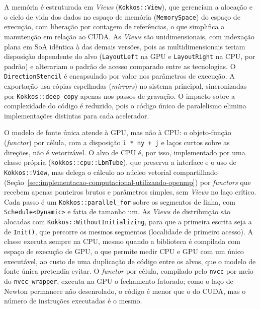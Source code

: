 A memória é estruturada em \textit{Views} (\texttt{Kokkos::View}), que gerenciam a alocação e o ciclo de vida dos dados no espaço de memória (\texttt{MemorySpace}) do espaço de execução, com liberação por contagem de referências, o que simplifica a manutenção em relação ao CUDA.
As \textit{Views} são unidimensionais, com indexação plana em SoA idêntica à das demais versões, pois as multidimensionais teriam disposição dependente do alvo (\texttt{LayoutLeft} na GPU e \texttt{LayoutRight} na CPU, por padrão) e alterariam o padrão de acesso comparado entre as tecnologias.
O \texttt{DirectionStencil} é encapsulado por valor nos parâmetros de execução.
A exportação usa cópias espelhadas (\textit{mirrors}) no sistema principal, sincronizadas por \texttt{Kokkos::deep\_copy} apenas nos passos de gravação.
O impacto sobre a complexidade do código é reduzido, pois o código único de paralelismo elimina implementações distintas para cada acelerador.

O modelo de fonte única atende à GPU, mas não à CPU: o objeto-função (\textit{functor}) por célula, com a disposição \texttt{i * ny + j} e laços curtos sobre as direções, não é vetorizável.
O alvo de CPU é, por isso, implementado por uma classe própria (\texttt{kokkos::cpu::LbmTube}), que preserva a interface e o uso de \texttt{Kokkos::View}, mas delega o cálculo ao núcleo vetorial compartilhado (Seção~\ref{sec:implementacao-computacional-utilizando-openmp}) por \textit{functors} que recebem apenas ponteiros brutos e parâmetros simples, sem \textit{Views} no laço crítico.
Cada passo é um \texttt{Kokkos::parallel\_for} sobre os segmentos de linha, com \texttt{Schedule<Dynamic>} e fatia de tamanho um. %
As \textit{Views} de distribuição são alocadas com \texttt{Kokkos::WithoutInitializing}, para que a primeira escrita seja a de \texttt{Init()}, que percorre os mesmos segmentos (localidade de primeiro acesso).
A classe executa sempre na CPU, mesmo quando a biblioteca é compilada com espaço de execução de GPU, o que permite medir CPU e GPU com um único executável, ao custo de uma duplicação de código entre os alvos, que o modelo de fonte única pretendia evitar.
O \textit{functor} por célula, compilado pelo \texttt{nvcc} por meio do \texttt{nvcc\_wrapper}, executa na GPU o fechamento fatorado; como o laço de Newton permanece não desenrolado, o código é menor que o do CUDA, mas o número de instruções executadas é o mesmo.


